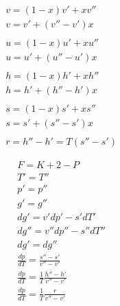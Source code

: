 \documentclass[twocolumn]{article}
\begin{document}
\begin{multicols}{2}

\begin{align*}
	& v = (1-x)v' + xv{''} \\
	& v = v' + (v''-v')x \\ \\
	& u = (1-x) u' + xu'' \\
	& u = u' + (u''-u')x \\ \\
	& h = (1-x) h' + xh'' \\
	& h = h' + (h''-h')x \\ \\
	& s = (1-x) s' + xs'' \\
	& s = s' + (s''-s')x \\ \\
	& r = h'' - h' = T(s''-s')
\end{align*}

\begin{align*}
	& F  = K + 2 - P \\
	& T' = T'' \\
	& p' = p'' \\
	& g' = g'' \\
	&dg' = v'dp' - s'dT' \\
	&dg'' = v'' dp'' - s'' dT'' \\
	&dg' = dg'' \\
	& \frac{dp}{dT} = \frac{s'' - s'}{v'' - v'} \\
	& \frac{dp}{dT} = \frac{1}{T}\frac{h'' - h'}{v'' - v'} \\
	& \frac{dp}{dT} = \frac{1}{T}\frac{r}{v'' -v'} \\
\end{align*}
\end{multicols}

\bigskip
\bigskip
\bigskip
\bigskip

%                                                                         
\end{document}
